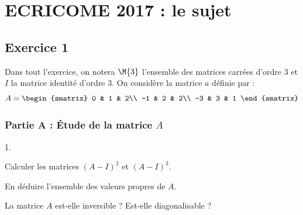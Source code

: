 \chapter*{ECRICOME 2017 : le sujet}
  
%

\section*{Exercice 1}

\noindent
Dans tout l'exercice, on notera $\M{3}$ l'ensemble des matrices
carrées d'ordre $3$ et $I$ la matrice identité d'ordre $3$. On
considère la matrice $a$ définie par :
\[
A = 
\begin{smatrix}
  0 & 1 & 2\\
  -1 & 2 & 2\\
  -3 & 3 & 1
\end{smatrix}
\]

\subsection*{Partie A : Étude de la matrice $A$}
\begin{noliste}{1.}
\item Calculer les matrices $(A-I)^2$ et $(A-I)^3$.



\item En déduire l'ensemble des valeurs propres de $A$.



\item La matrice $A$ est-elle inversible ? Est-elle diagonalisable ?

  
\end{noliste}




